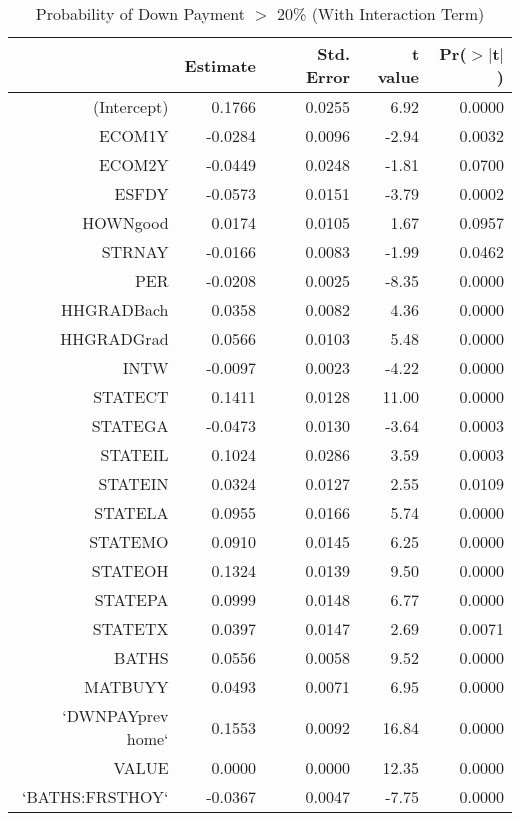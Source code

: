 \begin{table}[ht]
\centering
\begin{tabular}{rrrrr}
  \hline
 & Estimate & Std. Error & t value & Pr($>$$|$t$|$) \\ 
  \hline
(Intercept) & 0.1766 & 0.0255 & 6.92 & 0.0000 \\ 
  ECOM1Y & -0.0284 & 0.0096 & -2.94 & 0.0032 \\ 
  ECOM2Y & -0.0449 & 0.0248 & -1.81 & 0.0700 \\ 
  ESFDY & -0.0573 & 0.0151 & -3.79 & 0.0002 \\ 
  HOWNgood & 0.0174 & 0.0105 & 1.67 & 0.0957 \\ 
  STRNAY & -0.0166 & 0.0083 & -1.99 & 0.0462 \\ 
  PER & -0.0208 & 0.0025 & -8.35 & 0.0000 \\ 
  HHGRADBach & 0.0358 & 0.0082 & 4.36 & 0.0000 \\ 
  HHGRADGrad & 0.0566 & 0.0103 & 5.48 & 0.0000 \\ 
  INTW & -0.0097 & 0.0023 & -4.22 & 0.0000 \\ 
  STATECT & 0.1411 & 0.0128 & 11.00 & 0.0000 \\ 
  STATEGA & -0.0473 & 0.0130 & -3.64 & 0.0003 \\ 
  STATEIL & 0.1024 & 0.0286 & 3.59 & 0.0003 \\ 
  STATEIN & 0.0324 & 0.0127 & 2.55 & 0.0109 \\ 
  STATELA & 0.0955 & 0.0166 & 5.74 & 0.0000 \\ 
  STATEMO & 0.0910 & 0.0145 & 6.25 & 0.0000 \\ 
  STATEOH & 0.1324 & 0.0139 & 9.50 & 0.0000 \\ 
  STATEPA & 0.0999 & 0.0148 & 6.77 & 0.0000 \\ 
  STATETX & 0.0397 & 0.0147 & 2.69 & 0.0071 \\ 
  BATHS & 0.0556 & 0.0058 & 9.52 & 0.0000 \\ 
  MATBUYY & 0.0493 & 0.0071 & 6.95 & 0.0000 \\ 
  `DWNPAYprev home` & 0.1553 & 0.0092 & 16.84 & 0.0000 \\ 
  VALUE & 0.0000 & 0.0000 & 12.35 & 0.0000 \\ 
  `BATHS:FRSTHOY` & -0.0367 & 0.0047 & -7.75 & 0.0000 \\ 
   \hline
\end{tabular}
\caption{Probability of Down Payment $>$ 20\% (With Interaction Term)} 
\label{tab:reg4_fdr}
\end{table}
